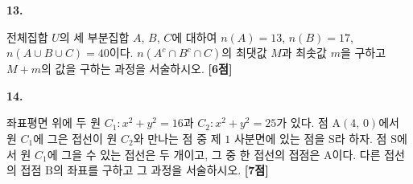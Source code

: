 \documentclass[10pt]{article}
\renewenvironment{problem}[2]{%
  \par%
  \setcounter{probnum}{#1}%
  \noindent
  \begin{minipage}[t]{\linewidth}%
  \setlength{\parskip}{4pt plus 1pt}%
  {\sffamily\bfseries\large\color{black}#1.}\par\smallskip\ignorespaces
}{%
  \end{minipage}\par%
}
\newcommand{\pts}[1]{\nobreak\hspace*{\fill}\textbf{[#1점]}\par}
\begin{document}
\noindent
\begin{minipage}[t][\probboxheight][t]{0.46\linewidth}\raggedright
\begin{problem}{13}{s}
전체집합 $U$의 세 부분집합 $A$, $B$, $C$에 대하여 $n(A)=13$, $n(B)=17$, $n(A\cup B\cup C)=40$이다. $n(A^{c}\cap B^{c}\cap C)$의 최댓값 $M$과 최솟값 $m$을 구하고 $M+m$의 값을 구하는 과정을 서술하시오. \pts{6}

\vspace{100mm}
\end{problem}
\end{minipage}%
\hfill
\begin{minipage}[t][\probboxheight][t]{0.46\linewidth}\raggedright
\begin{problem}{14}{s}
좌표평면 위에 두 원 $C_{1}: x^{2}+y^{2}=16$과 $C_{2}: x^{2}+y^{2}=25$가 있다. 점 $\mathrm{A}(4,\,0)$에서 원 $C_{1}$에 그은 접선이 원 $C_{2}$와 만나는 점 중 제 $1$ 사분면에 있는 점을 $\mathrm{S}$라 하자. 점 $\mathrm{S}$에서 원 $C_{1}$에 그을 수 있는 접선은 두 개이고, 그 중 한 접선의 접점은 $\mathrm{A}$이다. 다른 접선의 접점 $\mathrm{B}$의 좌표를 구하고 그 과정을 서술하시오. \pts{7}

\vspace{110mm}
\end{problem}
\end{minipage}

\clearpage
\end{document}
